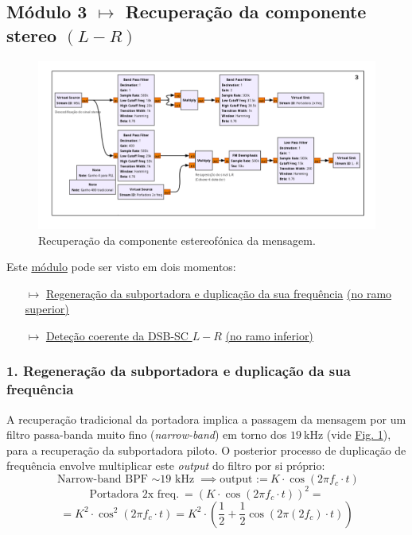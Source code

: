 \subsection{Módulo 3 $\pmb \mapsto$ Recuperaç\~ao da componente stereo $(L - R)$}
\label{subsec:mod3}

\begin{figure}[H]
    \centering
    \includegraphics[width = \linewidth]{img/mods/modulo3.png}
    \caption{Recuperação da componente estereofónica da mensagem.}
    \label{fig:modulo3}
\end{figure}

Este \hyperref[subsec:mod3]{módulo} pode ser visto em dois momentos: 
\begin{itemize}
    \item[$\mapsto$] \hyperref[subsubsec:regen]{Regeneração da subportadora e duplicação da sua frequência} \hyperref[fig:modulo3]{(no ramo superior)}
    \item[$\mapsto$] \hyperref[subsubsec:coherent]{Deteção coerente da DSB-SC $L-R$} \hyperref[fig:modulo3]{(no ramo inferior)}
\end{itemize}
\newpage
\subsubsection{1. Regeneração da subportadora e duplicação da sua frequência}
\label{subsubsec:regen}

A recuperação tradicional da portadora implica a passagem da mensagem por um filtro passa-banda muito fino (\textit{narrow-band}) em torno dos $19\ \text{kHz}$ (vide \hyperref[fig:stereo_spectrum]{Fig. 1}), para a recuperação da subportadora piloto. O posterior processo de duplicação de frequência envolve multiplicar este \textit{output} do filtro por si próprio:
$$\text{Narrow-band BPF $\sim$19 kHz} \implies \text{output :=}\ K \cdot\cos{(2\pi f_c\cdot t)} $$
$$ \text{Portadora 2x freq.}\ =  (K \cdot\cos{(2\pi f_c\cdot t)})^2 =$$
$$ = K^2 \cdot \cos^2{(2\pi f_c\cdot t)} = K^2 \cdot (\frac{1}{2} + \frac{1}{2}\cos{(2\pi (2f_c)\cdot t)})$$

